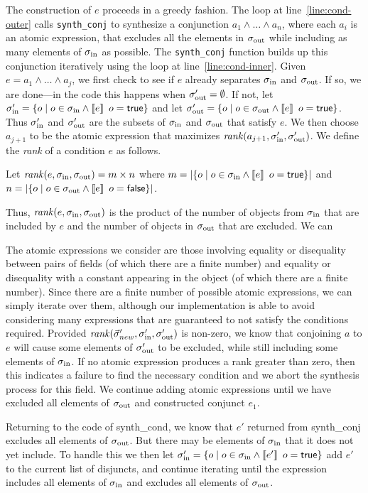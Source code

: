 \documentclass[natbib]{sigplanconf}
\newcommand{\code}[1]{\lstinline|#1|\xspace}
\begin{document}
The construction of $e$ proceeds in a greedy fashion.  The loop at
line~\ref{line:cond-outer} calls \code{synth_conj} to
synthesize a conjunction $a_1 \wedge \ldots \wedge a_n$, where each
$a_i$ is an atomic expression, that excludes all the elements in
$\sigma_{\text{out}}$ while including as many elements of $\sigma_{\text{in}}$ as possible.
The \code{synth_conj} function builds up this conjunction iteratively
using the loop at line~\ref{line:cond-inner}.
Given $e = a_1 \wedge \ldots \wedge a_j$, we first check to see if $e$
already separates $\sigma_{\text{in}}$ and $\sigma_{\text{out}}$.  If so, we are done---in the
code this happens when $\sigma_{\text{out}}' = \emptyset$.  If not, let $\sigma_{\text{in}}' =
\{o \mid o \in \sigma_{\text{in}} \wedge \llbracket e\rrbracket\,\ o = \mathsf{true}\}$ and let
$\sigma_{\text{out}}' = \{o \mid o \in \sigma_{\text{out}} \wedge \llbracket e\rrbracket\,\ o = \mathsf{true}\}$.
Thus $\sigma_{\text{in}}'$ and $\sigma_{\text{out}}'$ are the subsets of $\sigma_{\text{in}}$ and
$\sigma_{\text{out}}$ that satisfy $e$.  We then choose $a_{j+1}$ to be the atomic
expression that maximizes $\mathit{rank}(a_{j+1},\sigma_{\text{in}}',\sigma_{\text{out}}')$.  We
define the \emph{rank} of a condition $e$ as follows.
\begin{defn}
Let $\mathit{rank}(e,\sigma_{\text{in}},\sigma_{\text{out}}) = m \times n$ where $m = \lvert \{o
  \mid o \in \sigma_{\text{in}} \wedge \llbracket e\rrbracket\,\ o = \mathsf{true}\} \rvert$ and $n =
\lvert \{o \mid o \in \sigma_{\text{out}} \wedge \llbracket e\rrbracket\,\ o = \mathsf{false}\} \rvert$.
\end{defn}
Thus, $\mathit{rank}(e,\sigma_{\text{in}},\sigma_{\text{out}})$ is the product of the number of
objects from $\sigma_{\text{in}}$ that are included by $e$ and the number of
objects in $\sigma_{\text{out}}$ that are excluded.  We can 

The atomic expressions we consider are those involving equality or
disequality between pairs of fields (of which there are a finite
number) and equality or disequality with a constant appearing in the
object (of which there are a finite number).  Since there are a finite
number of possible atomic expressions, we can simply iterate over
them, although our implementation is able to avoid considering many
expressions that are guaranteed to not satisfy the conditions
required.  Provided
$\mathit{rank}(\vec{\sigma}'_{new},\sigma_{\text{in}}',\sigma_{\text{out}}')$ is non-zero, we know that
conjoining $a$ to $e$ will cause some elements of $\sigma_{\text{out}}'$ to be
excluded, while still including some elements of $\sigma_{\text{in}}$.
If no atomic expression produces a rank greater than zero, then
this indicates a failure to find the necessary condition and we abort
the synthesis process for this field.
We continue adding atomic expressions until we have excluded all
elements of $\sigma_{\text{out}}$ and constructed conjunct $e_1$.

Returning to the code of \textsf{synth\_cond}, we know that $e'$
returned from \textsf{synth\_conj} excludes all elements of $\sigma_{\text{out}}$.
But there may be elements of $\sigma_{\text{in}}$ that it does not yet include.
To handle this we then let $\sigma_{\text{in}}' = \{o \mid o \in \sigma_{\text{in}} \wedge
\llbracket e'\rrbracket\,\ o = \mathsf{true}\}$ add $e'$ to the current list of disjuncts,
and continue iterating until the expression includes all elements of
$\sigma_{\text{in}}$ and excludes all elements of $\sigma_{\text{out}}$.
\end{document}
